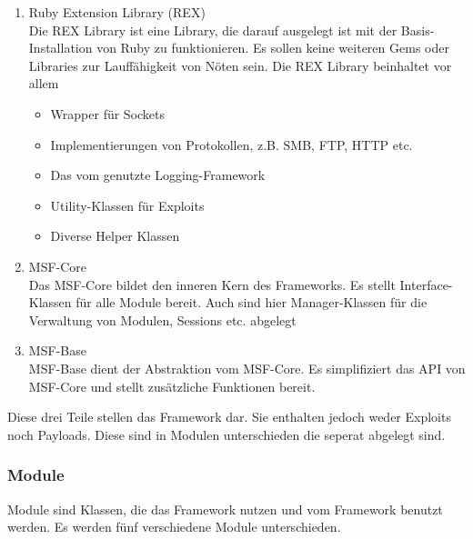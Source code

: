 \begin{enumerate}
  \item Ruby Extension Library (REX)\\
    Die REX Library ist eine Library, die darauf ausgelegt ist mit der
    Basis-Installation von Ruby zu funktionieren. Es sollen keine
    weiteren Gems oder Libraries zur Lauffähigkeit von Nöten sein. 
    Die REX Library beinhaltet vor allem 
    \begin{itemize}
      \item Wrapper für Sockets
      \item Implementierungen von Protokollen, z.B. SMB, FTP, HTTP
        etc.
      \item Das vom  genutzte Logging-Framework
      \item Utility-Klassen für Exploits 
      \item Diverse Helper Klassen
    \end{itemize}
  \item MSF-Core\\
    Das MSF-Core bildet den inneren Kern des Frameworks. Es stellt
    Interface-Klassen für alle Module bereit. Auch sind hier
    Manager-Klassen für die Verwaltung von Modulen, Sessions etc. abgelegt
  \item MSF-Base\\
    MSF-Base dient der Abstraktion vom MSF-Core. Es simplifiziert das
    API von MSF-Core und stellt zusätzliche Funktionen bereit. 
\end{enumerate}

Diese drei Teile stellen das Framework dar. Sie enthalten jedoch weder
Exploits noch Payloads. Diese sind in Modulen unterschieden die
seperat abgelegt sind.

\subsubsection{Module}

Module sind Klassen, die das Framework nutzen und vom Framework
benutzt werden. Es werden fünf verschiedene Module unterschieden. 

